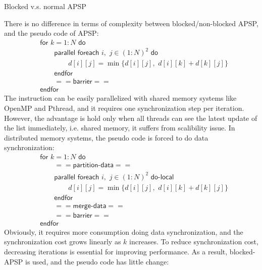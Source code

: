 \documentclass[12pt]{article}
\makeatletter
\renewenvironment{itemize}
{\list{$\bullet$}{\leftmargin\z@ \labelwidth\z@ \itemindent-\leftmargin
\let\makelabel\descriptionlabel}}
{\endlist}
\makeatother
\begin{document}
\begin{itemize}
    \item Blocked v.s. normal APSP
    \begin{flushleft}
        There is no difference in terms of complexity between blocked/non-blocked APSP, and the pseudo code of APSP:
        \begin{align*}
            &\mathsf{for} \,\, k = 1:N \,\, \mathsf{do} \\
            &\quad \quad \mathsf{parallel} \,\, \mathsf{foreach} \,\, i, \,\, j \in (1:N)^2 \,\, \mathsf{do} \\
            &\quad \quad \quad \quad d[i][j] = \min\big\{ d[i][j], \,\, d[i][k] + d[k][j] \big\} \\
            &\quad \quad \mathsf{endfor} \\
            &\quad \quad \mathsf{==barrier==} \\
            &\mathsf{endfor}
        \end{align*}
        The instruction can be easily parallelized with shared memory systems like OpenMP and Pthread, and it requires one synchronization step per iteration. However, the advantage is hold only when all threads can see the latest update of the list immediately, i.e. shared memory, it suffers from scalibility issue. In distributed memory systems, the pseudo code is forced to do data synchronization:
        \begin{align*}
            &\mathsf{for} \,\, k = 1:N \,\, \mathsf{do} \\
            &\quad \quad \mathsf{==partition\text{-}data==} \\
            &\quad \quad \mathsf{parallel} \,\, \mathsf{foreach} \,\, i, \,\, j \in (1:N)^2 \,\, \mathsf{do\text{-}local} \\
            &\quad \quad \quad \quad d[i][j] = \min\big\{ d[i][j], \,\, d[i][k] + d[k][j] \big\} \\
            &\quad \quad \mathsf{endfor} \\
            &\quad \quad \mathsf{==merge\text{-}data==} \\
            &\quad \quad \mathsf{==barrier==} \\
            &\mathsf{endfor}
        \end{align*}
        Obviously, it requires more consumption doing data synchronization, and the synchronization cost grows linearly as $k$ increases. To reduce synchronization cost, decreasing iterations is essential for improving performance. As a result, blocked-APSP is used, and the pseudo code has little change: 

\end{flushleft}
\end{itemize}
\end{document}
